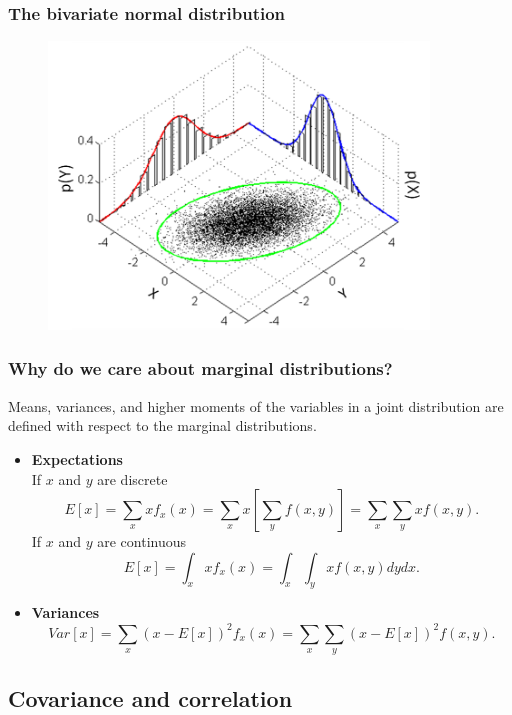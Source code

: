 \documentclass[a4paper,12pt]{article}
\begin{document}
\subsubsection*{The bivariate normal distribution}
\begin{figure}[H]
	\centering
		\includegraphics[width=0.90\textwidth]{figures/MultivariateNormal}
	\label{fig:MultivariateNormal}
\end{figure}




\subsubsection*{Why do we care about marginal distributions?}

Means, variances, and higher moments of the variables in a joint distribution are defined with respect to the marginal distributions.

\begin{itemize}
	\item \textbf{Expectations}\\
	If $x$ and $y$ are discrete
$$E[x] = \sum_{x}x f_{x}(x) =\sum_{x}x\left[\sum_{y}f(x, y)\right] = \sum_{x}\sum_{y} x f(x, y).$$
	If $x$ and $y$ are continuous
$$E[x] = \int_{x}x f_{x}(x) = \int_{x}\int_{y} x f(x, y)dydx.$$
	\item \textbf{Variances}
$$  Var[x] = \sum_{x}(x-E[x])^{2} f_{x}(x) = \sum_{x}\sum_{y} (x-E[x])^{2} f(x, y).$$

\end{itemize}



\subsection{Covariance and correlation}
\end{document}
